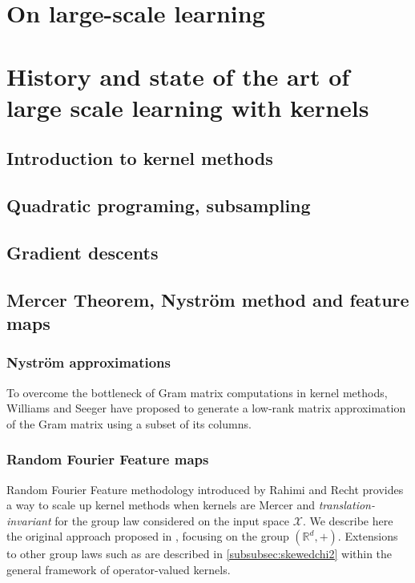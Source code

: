 \section{On large-scale learning}
\label{sec:on_large-scale_learning}

\section{History and state of the art of large scale learning with kernels}
\label{sec:history}

\subsection{Introduction to kernel methods}



\subsection{Quadratic programing, subsampling}

\subsection{Gradient descents}

\subsection{Mercer Theorem, Nystr\"om method and feature maps}
\subsubsection{Nystr\"om approximations}
To overcome the bottleneck of Gram matrix computations in kernel methods,
Williams and Seeger \cite{Williams2000-nystrom} have proposed to generate a
low-rank matrix approximation of the Gram matrix using a subset of its columns.
\subsubsection{Random Fourier Feature maps}
Random Fourier Feature methodology introduced  by Rahimi and Recht
\cite{Rahimi2007} provides a way to scale up kernel methods when kernels are
Mercer and \emph{translation-invariant}  for the group law considered on the
input space $\mathcal{X}$. We describe here the original approach proposed in
\cite{Rahimi2007}, focusing on the group $(\mathbb{R}^d, +)$. Extensions to
other group laws such as \cite{li2010random} are described in
\cref{subsubsec:skewedchi2} within the general framework of operator-valued
kernels.
